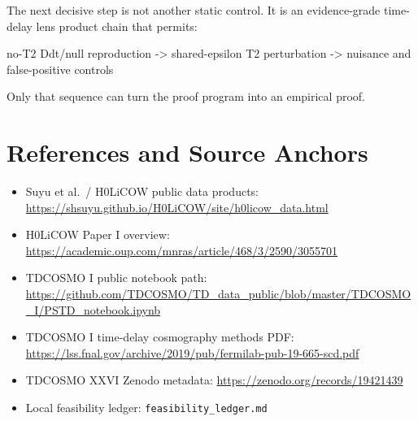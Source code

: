 \documentclass[11pt]{article}
\newenvironment{Shaded}{}{}
\newcommand{\NormalTok}[1]{#1}
\providecommand{\tightlist}{%
  \setlength{\itemsep}{0pt}\setlength{\parskip}{0pt}}
\begin{document}
The next decisive step is not another static control. It is an
evidence-grade time-delay lens product chain that permits:

\begin{Shaded}
\begin{Highlighting}[]
\NormalTok{no{-}T2 Ddt/null reproduction {-}\textgreater{} shared{-}epsilon T2 perturbation {-}\textgreater{} nuisance and}
\NormalTok{false{-}positive controls}
\end{Highlighting}
\end{Shaded}

Only that sequence can turn the proof program into an empirical proof.

\section*{References and Source Anchors}\label{references-and-source-anchors}

\begin{itemize}
\tightlist
\item
  Suyu et al.~/ H0LiCOW public data products:
  \url{https://shsuyu.github.io/H0LiCOW/site/h0licow_data.html}
\item
  H0LiCOW Paper I overview:
  \url{https://academic.oup.com/mnras/article/468/3/2590/3055701}
\item
  TDCOSMO I public notebook path:
  \url{https://github.com/TDCOSMO/TD_data_public/blob/master/TDCOSMO_I/PSTD_notebook.ipynb}
\item
  TDCOSMO I time-delay cosmography methods PDF:
  \url{https://lss.fnal.gov/archive/2019/pub/fermilab-pub-19-665-scd.pdf}
\item
  TDCOSMO XXVI Zenodo metadata:
  \url{https://zenodo.org/records/19421439}
\item
  Local feasibility ledger: \texttt{feasibility\_ledger.md}
\end{itemize}
\end{document}
